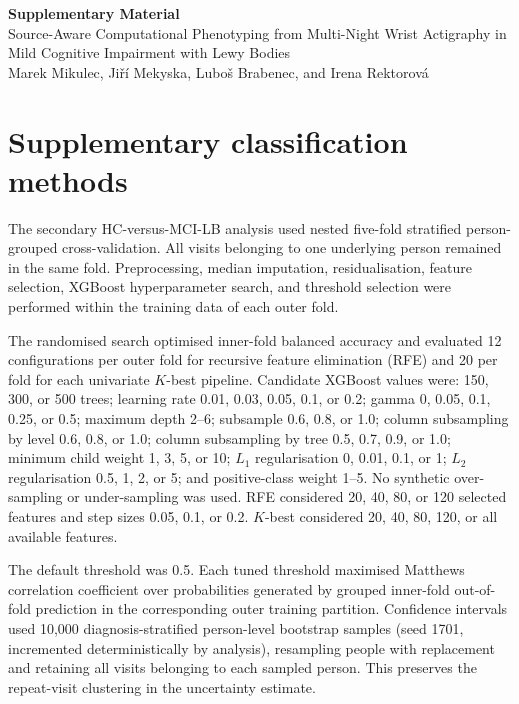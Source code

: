 \documentclass[11pt,a4paper]{article}
\begin{document}
\begin{center}
{\Large\bfseries Supplementary Material}\\[6pt]
{\large Source-Aware Computational Phenotyping from Multi-Night Wrist
Actigraphy in Mild Cognitive Impairment with Lewy Bodies}\\[8pt]
Marek Mikulec, Jiří Mekyska, Luboš Brabenec, and Irena Rektorová
\end{center}

\section*{Supplementary classification methods}

The secondary HC-versus-MCI-LB analysis used nested five-fold stratified
person-grouped cross-validation. All visits belonging to one underlying person
remained in the same fold. Preprocessing, median imputation, residualisation,
feature selection, XGBoost hyperparameter search, and threshold selection were
performed within the training data of each outer fold.

The randomised search optimised inner-fold balanced accuracy and evaluated 12
configurations per outer fold for recursive feature elimination (RFE) and 20
per fold for each univariate $K$-best pipeline. Candidate XGBoost values were:
150, 300, or 500 trees; learning rate 0.01, 0.03, 0.05, 0.1, or 0.2; gamma 0,
0.05, 0.1, 0.25, or 0.5; maximum depth 2--6; subsample 0.6, 0.8, or 1.0;
column subsampling by level 0.6, 0.8, or 1.0; column subsampling by tree 0.5,
0.7, 0.9, or 1.0; minimum child weight 1, 3, 5, or 10; $L_1$ regularisation
0, 0.01, 0.1, or 1; $L_2$ regularisation 0.5, 1, 2, or 5; and positive-class
weight 1--5. No synthetic over-sampling or under-sampling was used. RFE
considered 20, 40, 80, or 120 selected features and step sizes 0.05, 0.1, or
0.2. $K$-best considered 20, 40, 80, 120, or all available features.

The default threshold was 0.5. Each tuned threshold maximised Matthews
correlation coefficient over probabilities generated by grouped inner-fold
out-of-fold prediction in the corresponding outer training partition.
Confidence intervals used 10,000 diagnosis-stratified person-level bootstrap
samples (seed 1701, incremented deterministically by analysis), resampling
people with replacement and retaining all visits belonging to each sampled
person. This preserves the repeat-visit clustering in the uncertainty estimate.
\end{document}
